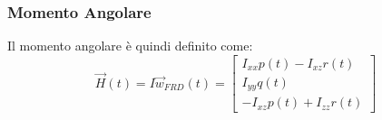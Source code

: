 \subsubsection{Momento Angolare}
Il momento angolare è quindi definito come:
\begin{equation}
    \label{eq:momentoAngolare}
    \vec{H}(t) = I \vec{w}_{FRD}(t) = \begin{bmatrix}
        I_{xx}p(t) - I_{xz}r(t) \\
        I_{yy}q(t)              \\
        - I_{xz}p(t) + I_{zz}r(t)
    \end{bmatrix}
\end{equation}
